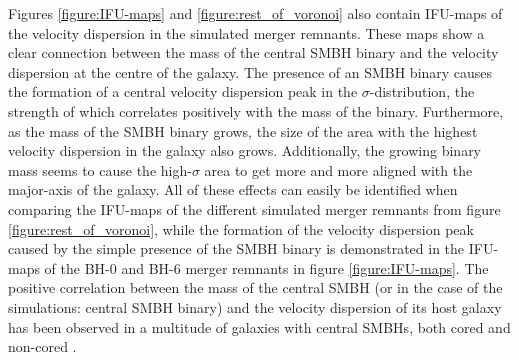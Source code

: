 \documentclass[english, oneside]{HYgradu}
\begin{document}
Figures \ref{figure:IFU-maps} and \ref{figure:rest_of_voronoi} also contain IFU-maps of the velocity dispersion in the simulated merger remnants. These maps show a clear connection between the mass of the central SMBH binary and the velocity dispersion at the centre of the galaxy. The presence of an SMBH binary causes the formation of a central velocity dispersion peak in the $\sigma$-distribution, the strength of which correlates positively with the mass of the binary. Furthermore, as the mass of the SMBH binary grows, the size of the area with the highest velocity dispersion in the galaxy also grows. Additionally, the growing binary mass seems to cause the high-$\sigma$ area to get more and more aligned with the major-axis of the galaxy. All of these effects can easily be identified when comparing the IFU-maps of the different simulated merger remnants from figure \ref{figure:rest_of_voronoi}, while the formation of the velocity dispersion peak caused by the simple presence of the SMBH binary is demonstrated in the IFU-maps of the BH-0 and BH-6 merger remnants in figure \ref{figure:IFU-maps}. The positive correlation between the mass of the central SMBH (or in the case of the simulations: central SMBH binary) and the velocity dispersion of its host galaxy has been observed in a multitude of galaxies with central SMBHs, both cored and non-cored \citep{Ferrarese2000}.
\end{document}
